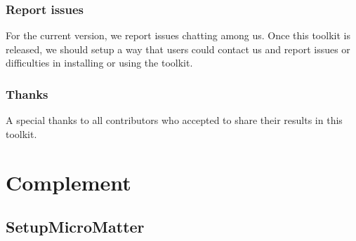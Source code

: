 \documentclass[letterpaper,10pt,english]{sphinxmanual}
\begin{document}
\subsection{Report issues}
\label{\detokenize{source/miscelaneous:report-issues}}\label{\detokenize{source/miscelaneous:id3}}
\sphinxAtStartPar
For the current version, we report issues chatting among us.
Once this toolkit is released, we should setup a way that users could contact us and report issues or difficulties in installing or using the toolkit.


\subsection{Thanks}
\label{\detokenize{source/miscelaneous:thanks}}\label{\detokenize{source/miscelaneous:id4}}
\sphinxAtStartPar
A special thanks to all contributors who accepted to share their results in this toolkit.


\chapter{Complement}
\label{\detokenize{index:complement}}
\sphinxstepscope


\section{SetupMicroMatter}
\label{\detokenize{source/api/setup_micro_matter:setupmicromatter}}\label{\detokenize{source/api/setup_micro_matter::doc}}\label{\detokenize{source/api/setup_micro_matter:module-nucleardatapy.setup_micro_matter}}
\end{document}
